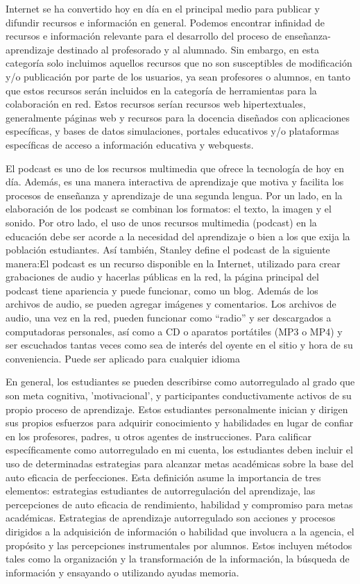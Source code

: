 Internet se ha convertido hoy en día en el principal medio para publicar y difundir recursos e 
información en general. Podemos encontrar infinidad de recursos e información relevante para el 
desarrollo del proceso de enseñanza- aprendizaje destinado al profesorado y al alumnado. Sin embargo,
en esta categoría solo incluimos aquellos recursos que no son susceptibles de modificación y/o
publicación por parte de los usuarios, ya sean profesores o alumnos, en tanto que estos recursos serán
incluidos en la categoría de herramientas para la colaboración en red. Estos recursos serían recursos
web hipertextuales, generalmente páginas web y recursos para la docencia diseñados con aplicaciones
específicas, y bases de datos simulaciones, portales educativos y/o plataformas específicas de acceso a
información educativa y webquests. 

El podcast es uno de los recursos multimedia que ofrece la tecnología de hoy en día. Además, es una 
manera interactiva de aprendizaje que motiva y facilita los procesos de enseñanza y aprendizaje de una
segunda lengua. Por un lado, en la elaboración de los podcast se combinan los formatos: el texto, la imagen
y el sonido. Por otro lado, el uso de unos recursos multimedia (podcast) en la educación debe ser acorde a
la necesidad del aprendizaje o bien a los que exija la población estudiantes. Así también, Stanley define
el podcast de la siguiente manera:El podcast es un recurso disponible en la Internet, utilizado para crear
grabaciones de audio y hacerlas públicas en la red, la página principal del podcast tiene apariencia y puede
funcionar, como un blog. Además de los archivos de audio, se pueden agregar imágenes y comentarios. Los 
archivos de audio, una vez en la red, pueden funcionar como “radio” y ser descargados a computadoras 
personales, así como a CD o aparatos portátiles (MP3 o MP4) y ser escuchados tantas veces como sea de interés
del oyente en el sitio y hora de su conveniencia. Puede ser aplicado para cualquier
idioma

En general, los estudiantes se pueden describirse como autorregulado al grado que son meta cognitiva, 
'motivacional', y participantes conductivamente activos de su propio proceso de aprendizaje. Estos estudiantes personalmente inician y dirigen sus propios esfuerzos para adquirir conocimiento y habilidades en lugar de
confiar en los profesores, padres, u otros agentes de instrucciones. Para calificar específicamente como 
autorregulado en mi cuenta, los estudiantes deben incluir el uso de determinadas estrategias para alcanzar
metas académicas sobre la base del auto eficacia de perfecciones. Esta definición asume la importancia de tres
elementos: estrategias estudiantes de autorregulación del aprendizaje, las percepciones de auto eficacia de
rendimiento, habilidad y compromiso para metas académicas. Estrategias de aprendizaje autorregulado son 
acciones y procesos dirigidos a la adquisición de información o habilidad que involucra a la agencia, el
propósito y las percepciones instrumentales por alumnos. Estos incluyen métodos tales como la organización y la
transformación de la información, la búsqueda de información y ensayando o utilizando ayudas memoria. 

